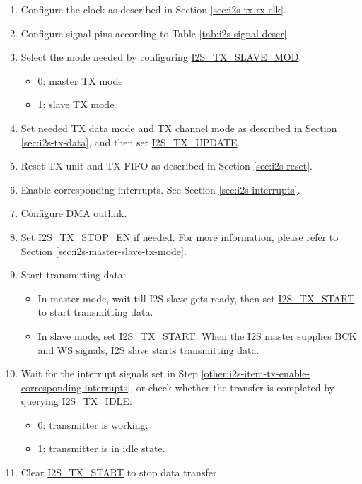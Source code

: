 \documentclass[main\_\_EN.tex]{subfiles}
\begin{document}
\begin{enumerate}
    \item Configure the clock as described in Section \ref{sec:i2s-tx-rx-clk}.

    \item Configure signal pins according to Table \ref{tab:i2s-signal-descr}.
    
    \item Select the mode needed by configuring \hyperref[fielddesc:I2STXSLAVEMOD]{I2S\_TX\_SLAVE\_MOD}.
    \begin{itemize}
        \item 0: master TX mode
        \item 1: slave TX mode
    \end{itemize}
   
    \item Set needed TX data mode and TX channel mode as described in Section \ref{sec:i2s-tx-data}, and then set \hyperref[fielddesc:I2STXUPDATE]{I2S\_TX\_UPDATE}.

    \item Reset TX unit and TX FIFO as described in Section \ref{sec:i2s-reset}.
    \item Enable corresponding interrupts. See Section \ref{sec:i2s-interrupts}.\label{other:i2s-item-tx-enable-corresponding-interrupts}
    
    \item Configure DMA outlink. 
    
    \item Set \hyperref[fielddesc:I2STXSTOPEN]{I2S\_TX\_STOP\_EN} if needed. For more information, please refer to Section \ref{sec:i2s-master-slave-tx-mode}. 

    \item Start transmitting data:
    \begin{itemize}
        \item In master mode, wait till I2S slave gets ready, then set \hyperref[fielddesc:I2STXSTART]{I2S\_TX\_START} to start transmitting data.
        \item In slave mode, set \hyperref[fielddesc:I2STXSTART]{I2S\_TX\_START}. When the I2S master supplies BCK and WS signals, I2S slave starts transmitting data.
    \end{itemize}

    \item Wait for the interrupt signals set in Step \ref{other:i2s-item-tx-enable-corresponding-interrupts}, or check whether the transfer is completed by querying \hyperref[fielddesc:I2STXIDLE]{I2S\_TX\_IDLE}:
    \begin{itemize}
        \item 0: transmitter is working;
        \item 1: transmitter is in idle state.
    \end{itemize}
    
    \item Clear \hyperref[fielddesc:I2STXSTART]{I2S\_TX\_START} to stop data transfer.
\end{enumerate}
\end{document}
